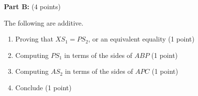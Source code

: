 \vspace*{0.6cm}
\textbf{Part B:} \dotfill ($4$ points)

The following are additive.
\begin{enumerate}[label=(b.\arabic*)]
\item Proving that $XS_1=PS_2$, or an equivalent equality \dotfill (1 point)
    \item Computing $PS_1$ in terms of the sides of $ABP$ \dotfill (1 point)
    \item Computing $AS_2$ in terms of the sides of $APC$ \dotfill (1 point)
    \item Conclude \dotfill (1 point)
\end{enumerate}
